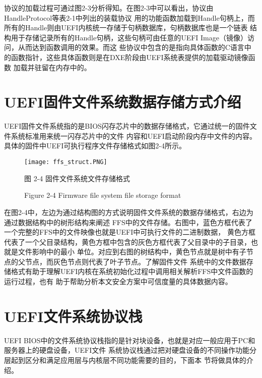 \par 协议的加载过程可通过图2-3分析得知。在图2-3中可以看出，协议由HandleProtocol等表2-1中列出的装载协议
用的功能函数加载到Handle句柄上，而所有的Handle则由UEFI内核统一存储于句柄数据库，句柄数据库也是一个链表
结构用于存储记录所有的Handle句柄，这些句柄可由任意的UEFI Image（镜像）访问，从而达到函数调用的效果。而这
些协议中包含的是指向具体函数的C语言中的函数指针，这些具体函数则是在DXE阶段由UEFI系统表提供的加载驱动镜像函数
加载并驻留在内存中的。

%
%
\section{UEFI固件文件系统数据存储方式介绍}
UEFI固件文件系统指的是BIOS闪存芯片中的数据存储格式，它通过统一的固件文件系统标准用来统一闪存芯片中的文件
内容和UEFI启动阶段内存中文件的内容\cite{chinese21}。具体的固件中UEFI可执行程序文件存储格式如图2-4所示。

\begin{figure}[htb]
    \label{ffs_format}
    \vspace{0cm}   
    \setlength{\abovecaptionskip}{0.3cm}  
	\centering
    \texttt{[image: ffs\_struct.PNG]}
    \caption*{图 2-4 固件文件系统文件存储格式}
    \setlength{\belowcaptionskip}{-0.7cm}
    \caption*{Figure 2-4 Firmware file system file storage format}
\end{figure}

在图2-4中，左边为通过结构图的方式说明固件文件系统的数据存储格式，右边为通过数据结构中的树形结构来阐述
FFS中的文件存储。右图中，蓝色方框代表了一个完整的FFS中的文件映像也就是UEFI中可执行文件的二进制数据，
黄色方框代表了一个父目录结构，黄色方框中包含的灰色方框代表了父目录中的子目录，也就是文件影响中的最小
单位。对应到右图的树结构中，黄色节点就是树中有子节点的父节点，而灰色节点则代表了叶子节点。了解固件文件
系统中的文件数据存储格式有助于理解UEFI内核在系统初始化过程中调用相关解析FFS中文件函数的运行过程，也有
助于帮助分析本文安全方案中可信度量的具体数据内容。
%
%
\section{UEFI文件系统协议栈}
UEFI BIOS中的文件系统协议栈指的是针对块设备，也就是对应一般应用于PC和服务器上的硬盘设备，UEFI文件
系统协议栈通过把对硬盘设备的不同操作功能分层起到区分和满足应用层与内核层不同功能需要的目的，下面本
节将做具体的介绍。
